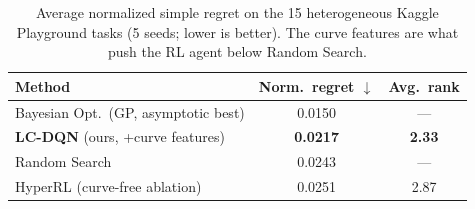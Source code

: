 \begin{table}
  \centering
  \caption{Average normalized simple regret on the 15 heterogeneous Kaggle
  Playground tasks (5 seeds; lower is better). The curve features are what push
  the RL agent below Random Search.}
  \begin{tabular}{l c c}
    \toprule
    \textbf{Method} & \textbf{Norm.\ regret} $\downarrow$ & \textbf{Avg.\ rank} \\
    \midrule
    Bayesian Opt.\ (GP, asymptotic best)    & 0.0150 & --- \\
    \rowcolor{orange!18}
    \textbf{LC-DQN} (ours, +curve features) & \textbf{0.0217} & \textbf{2.33} \\
    Random Search                           & 0.0243 & --- \\
    HyperRL (curve-free ablation)           & 0.0251 & 2.87 \\
    \bottomrule
  \end{tabular}
  \label{tab:results}
\end{table}
